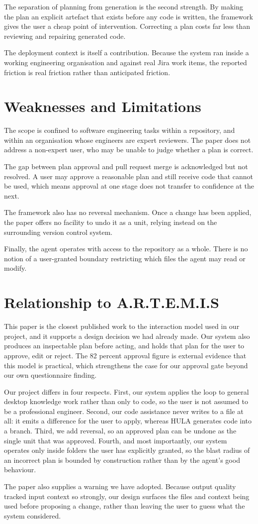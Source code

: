 \documentclass[11pt,a4paper]{article}
\begin{document}
The separation of planning from generation is the second strength. By making
the plan an explicit artefact that exists before any code is written, the
framework gives the user a cheap point of intervention. Correcting a plan costs
far less than reviewing and repairing generated code.

The deployment context is itself a contribution. Because the system ran inside
a working engineering organisation and against real Jira work items, the
reported friction is real friction rather than anticipated friction.

\section{Weaknesses and Limitations}

The scope is confined to software engineering tasks within a repository, and
within an organisation whose engineers are expert reviewers. The paper does not
address a non-expert user, who may be unable to judge whether a plan is
correct.

The gap between plan approval and pull request merge is acknowledged but not
resolved. A user may approve a reasonable plan and still receive code that
cannot be used, which means approval at one stage does not transfer to
confidence at the next.

The framework also has no reversal mechanism. Once a change has been applied,
the paper offers no facility to undo it as a unit, relying instead on the
surrounding version control system.

Finally, the agent operates with access to the repository as a whole. There is
no notion of a user-granted boundary restricting which files the agent may read
or modify.

\section{Relationship to A.R.T.E.M.I.S}

This paper is the closest published work to the interaction model used in our
project, and it supports a design decision we had already made. Our system also
produces an inspectable plan before acting, and holds that plan for the user to
approve, edit or reject. The 82 percent approval figure is external evidence
that this model is practical, which strengthens the case for our approval gate
beyond our own questionnaire finding.

Our project differs in four respects. First, our system applies the loop to
general desktop knowledge work rather than only to code, so the user is not
assumed to be a professional engineer. Second, our code assistance never writes
to a file at all: it emits a difference for the user to apply, whereas HULA
generates code into a branch. Third, we add reversal, so an approved plan can be
undone as the single unit that was approved. Fourth, and most importantly, our
system operates only inside folders the user has explicitly granted, so the
blast radius of an incorrect plan is bounded by construction rather than by the
agent's good behaviour.

The paper also supplies a warning we have adopted. Because output quality
tracked input context so strongly, our design surfaces the files and context
being used before proposing a change, rather than leaving the user to guess what
the system considered.
\end{document}
